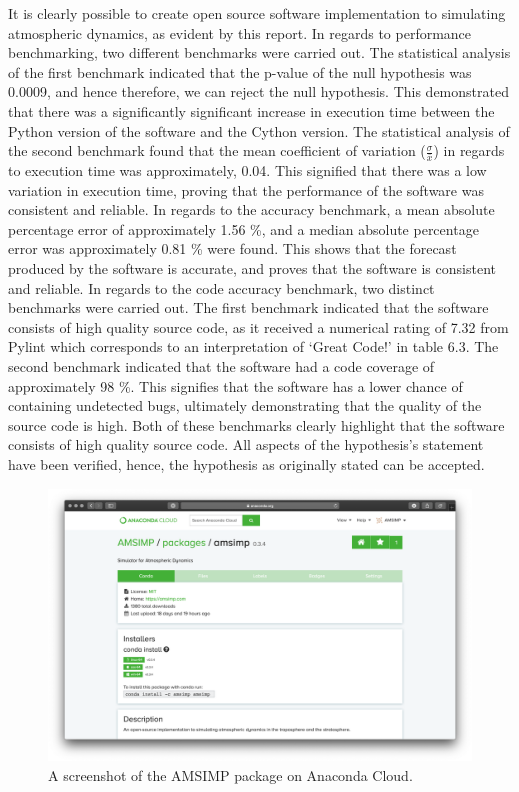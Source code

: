 It is clearly possible to create open source software implementation to simulating atmospheric dynamics, as evident by this report. In regards to performance benchmarking, two different benchmarks were carried out. The statistical analysis of the first benchmark indicated that the p-value of the null hypothesis was 0.0009, and hence therefore, we can reject the null hypothesis. This demonstrated that there was a significantly significant increase in execution time between the Python version of the software and the Cython version. The statistical analysis of the second benchmark found that the mean coefficient of variation ($\frac{\sigma}{\bar{x}}$) in regards to execution time was approximately, 0.04. This signified that there was a low variation in execution time, proving that the performance of the software was consistent and reliable. In regards to the accuracy benchmark, a mean absolute percentage error of approximately 1.56 \%, and a median absolute percentage error was approximately 0.81 \% were found. This shows that the forecast produced by the software is accurate, and proves that the software is consistent and reliable. In regards to the code accuracy benchmark, two distinct benchmarks were carried out. The first benchmark indicated that the software consists of high quality source code, as it received a numerical rating of 7.32 from Pylint which corresponds to an interpretation of `Great Code!' in table 6.3. The second benchmark indicated that the software had a code coverage of approximately 98 \%. This signifies that the software has a lower chance of containing undetected bugs, ultimately demonstrating that the quality of the source code is high. Both of these benchmarks clearly highlight that the software consists of high quality source code. All aspects of the hypothesis's statement have been verified, hence, the hypothesis as originally stated can be accepted.

\begin{figure}[H]
    \centering
    \includegraphics[width=.8\linewidth]{Images/anaconda.png}
    \caption{A screenshot of the AMSIMP package on Anaconda Cloud.}
    \label{pypi}
\end{figure}

